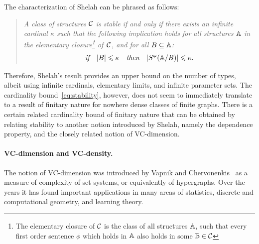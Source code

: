 The characterization of Shelah can be phrased as follows:
 \begin{quote}
 	\itshape A class of structures $\cal C$
	is stable if and only if 
	there exists 
	an infinite cardinal $\kappa$
	such that the following implication holds for all
	structures
	$\str A$ in the elementary closure\footnote{The elementary closure of $\cal C$ is 
	the class of all structures $\str A$,
	such that  every first order sentence $\phi$
	which holds in $\str A$ also holds in some $\str B\in \cal C$} of~$\cal C$, and for all $B\subset \str A$:
  \begin{align}\label{eq:stability}
  \textit{if\quad}|B|\le \kappa\textit {\quad then\quad}
|S^\phi(\str A/B)|\le \kappa.    
  \end{align}
 \end{quote}
Therefore, %
Shelah's result provides an upper bound on the number of types, albeit using infinite cardinals, elementary limits, and infinite parameter sets.
%
%
%
%
 The cardinality bound~\eqref{eq:stability},
 however, does not seem to  immediately translate to a result of finitary nature for nowhere dense  classes of finite graphs.  There is 
 a certain related cardinality bound  of finitary nature
that can be obtained by relating stability  
 to another notion introduced by Shelah, namely the dependence property, and the closely related notion of VC-dimension. %
  
%
%
%
%
%



\paragraph{VC-dimension and VC-density.} The notion of VC-dimension was introduced by 
Vapnik and Chervonenkis~\cite{chervonenkis1971theory} as a measure of complexity of set systems, or equivalently of hypergraphs.
Over the years it
has found important applications in many areas of
statistics, discrete and computational geometry, 
and learning theory. 

